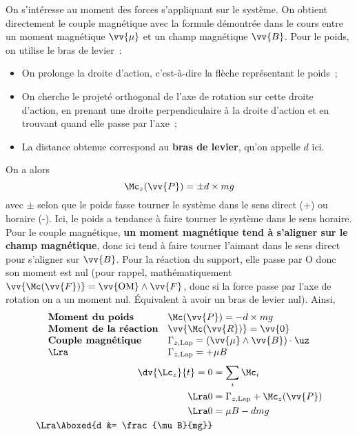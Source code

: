\documentclass[a4paper, 11pt, final, garamond]{book}
\begin{document}
\begin{itemize}[label=$\diamond$, leftmargin=10pt]
  On s'intéresse au moment des forces s'appliquant sur le système. On obtient
  directement le couple magnétique avec la formule démontrée dans le cours
  entre un moment magnétique $\vv{\mu}$ et un champ magnétique $\vv{B}$. Pour
  le poids, on utilise le bras de levier~:
  \begin{itemize}
    \item On prolonge la droite d'action, c'est-à-dire la flèche représentant
      le poids~;
    \item On cherche le projeté orthogonal de l'axe de rotation sur cette
      droite d'action, en prenant une droite perpendiculaire à la droite
      d'action et en trouvant quand elle passe par l'axe~;
    \item La distance obtenue correspond au \textbf{bras de levier}, qu'on
      appelle $d$ ici.
  \end{itemize}
  On a alors
  \[
    \Mc_z(\vv{P}) = \pm d \times mg
  \]
  avec $\pm $ selon que le poids fasse tourner le système dans le sens direct
  (+) ou horaire (-). Ici, le poids a tendance à faire tourner le système dans
  le sens horaire.
  \smallbreak
  Pour le couple magnétique, \textbf{un moment magnétique tend à s'aligner sur
  le champ magnétique}, donc ici tend à faire tourner l'aimant dans le sens
  direct pour s'aligner sur $\vv{B}$.
  \smallbreak
  Pour la réaction du support, elle passe par O donc son moment est nul (pour
  rappel, mathématiquement $\vv{\Mc(\vv{F})} = \vv{\rm OM}\wedge \vv{F}$, donc
  si la force passe par l'axe de rotation on a un moment nul. Équivalent à
  avoir un bras de levier nul). Ainsi,
  \[
    \begin{array}{ll}
      \textbf{Moment du poids} & \Mc(\vv{P}) = -d\times mg
      \\
      \textbf{Moment de la réaction} & \vv{\Mc(\vv{R})} = \vv{0}
      \\
      \textbf{Couple magnétique} &
      \Gamma_{z, \rm Lap} = (\vv{\mu} \wedge \vv{B})\cdot \uz
      \\
      \Lra & \Gamma_{z, \rm Lap} = +\mu B
    \end{array}
  \]
  \begin{align*}
    \dv{\Lc_z}{t} = 0 &= \sum_{i} \Mc_i
    \\\Lra 
    0 &= \Gamma_{z, \rm Lap} + \Mc_{z}(\vv{P})
    \\\Lra 
    0 &= \mu B - dmg
    \\\Lra 
    \Aboxed{d &= \frac{\mu B}{mg}}
  \end{align*}
\end{itemize}
\end{document}
